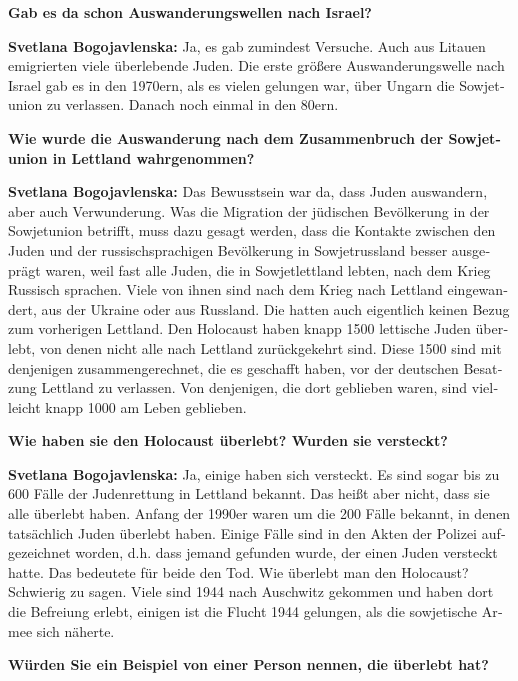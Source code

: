 \begin{otherlanguage}{ngerman}
\textbf{Gab es da schon Auswanderungswellen nach Israel?}

\textbf{Svetlana Bogojavlenska:} Ja, es gab zumindest Versuche. Auch aus Litauen emigrierten viele überlebende Juden. Die erste größere Auswanderungswelle nach Israel gab es in den 1970ern, als es vielen gelungen war, über Ungarn die Sowjetunion zu verlassen. Danach noch einmal in den 80ern. 

\textbf{Wie wurde die Auswanderung nach dem Zusammenbruch der Sowjetunion in Lettland wahrgenommen?}

\textbf{Svetlana Bogojavlenska:} Das Bewusstsein war da, dass Juden auswandern, aber auch Verwunderung. Was die Migration der jüdischen Bevölkerung in der Sowjetunion betrifft, muss dazu gesagt werden, dass die Kontakte zwischen den Juden und der russischsprachigen Bevölkerung in Sowjetrussland besser ausgeprägt waren, weil fast alle Juden, die in Sowjetlettland lebten, nach dem Krieg Russisch sprachen. Viele von ihnen sind nach dem Krieg nach Lettland eingewandert, aus der Ukraine oder aus Russland. Die hatten auch eigentlich keinen Bezug zum vorherigen Lettland. Den Holocaust haben knapp 1500 lettische Juden überlebt, von denen nicht alle nach Lettland zurückgekehrt sind. Diese 1500 sind mit denjenigen zusammengerechnet, die es geschafft haben, vor der deutschen Besatzung Lettland zu verlassen. Von denjenigen, die dort geblieben waren, sind vielleicht knapp 1000 am Leben geblieben.

\textbf{Wie haben sie den Holocaust überlebt? Wurden sie versteckt?}

\textbf{Svetlana Bogojavlenska:} Ja, einige haben sich versteckt. Es sind sogar bis zu 600 Fälle der Judenrettung in Lettland bekannt. Das heißt aber nicht, dass sie alle überlebt haben. Anfang der 1990er waren um die 200 Fälle bekannt, in denen tatsächlich Juden überlebt haben. Einige Fälle sind in den Akten der Polizei aufgezeichnet worden, d.h. dass jemand gefunden wurde, der einen Juden versteckt hatte. Das bedeutete für beide den Tod. Wie überlebt man den Holocaust? Schwierig zu sagen. Viele sind 1944 nach Auschwitz gekommen und haben dort die Befreiung erlebt, einigen ist die Flucht 1944 gelungen, als die sowjetische Armee sich näherte.

\textbf{Würden Sie ein Beispiel von einer Person nennen, die überlebt hat?}


\end{otherlanguage}
